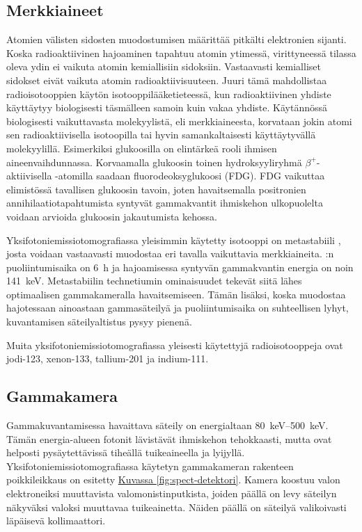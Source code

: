 \subsection{Merkkiaineet}
Atomien välisten sidosten muodostumisen määrittää pitkälti elektronien sijanti. Koska radioaktiivinen hajoaminen tapahtuu atomin ytimessä, virittyneessä tilassa oleva ydin ei vaikuta atomin kemiallisiin sidoksiin. Vastaavasti kemialliset sidokset eivät vaikuta atomin radioaktiivisuuteen.\cite{cherry_modes_2012} Juuri tämä mahdollistaa radioisotooppien käytön isotooppilääketieteessä, kun radioaktiivinen yhdiste käyttäytyy biologisesti täsmälleen samoin kuin vakaa yhdiste. Käytännössä biologisesti vaikuttavasta molekyylistä, eli merkkiaineesta, korvataan jokin atomi sen radioaktiivisella isotoopilla tai hyvin samankaltaisesti käyttäytyvällä molekyylillä\cite{cherry_modes_2012, crisan_radiopharmaceuticals_2022}. Esimerkiksi glukoosilla on elintärkeä rooli ihmisen aineenvaihdunnassa. Korvaamalla glukoosin toinen hydroksyyliryhmä $\beta^{+}$-aktiivisella -atomilla saadaan fluorodeoksyglukoosi (FDG). FDG vaikuttaa elimistössä tavallisen glukoosin tavoin, joten havaitsemalla positronien annihilaatiotapahtumista syntyvät gammakvantit ihmiskehon ulkopuolelta voidaan arvioida glukoosin jakautumista kehossa.\cite{crisan_radiopharmaceuticals_2022}

Yksifotoniemissiotomografiassa yleisimmin käytetty isotooppi on metastabiili , josta voidaan vastaavasti muodostaa eri tavalla vaikuttavia merkkiaineita. :n puoliintumisaika on \qty{6}{\hour} ja hajoamisessa syntyvän gammakvantin energia on noin \qty{141}{\kilo\electronvolt}.\cite{cherry_interaction_2012, cherry_single_2012, crisan_radiopharmaceuticals_2022, van_audenhaege_review_2015} Metastabiilin technetiumin ominaisuudet tekevät siitä lähes optimaalisen gammakameralla havaitsemiseen. Tämän lisäksi, koska  muodostaa hajotessaan ainoastaan gammasäteilyä ja puoliintumisaika on suhteellisen lyhyt, kuvantamisen säteilyaltistus pysyy pienenä.\cite{cherry_modes_2012, crisan_radiopharmaceuticals_2022}

Muita yksifotoniemissiotomografiassa yleisesti käytettyjä radioisotooppeja ovat jodi-123, xenon-133, tallium-201 ja indium-111\cite{crisan_radiopharmaceuticals_2022}.

\subsection{Gammakamera}
Gammakuvantamisessa havaittava säteily on energialtaan \qtyrange{80}{500}{\kilo\electronvolt}. Tämän energia-alueen fotonit lävistävät ihmiskehon tehokkaasti, mutta ovat helposti pysäytettävissä tiheällä tuikeaineella ja lyijyllä.\cite{cherry_gamma_2012} Yksifotoniemissiotomografiassa käytetyn gammakameran rakenteen poikkileikkaus on esitetty \hyperref[fig:spect-detektori]{Kuvassa \ref*{fig:spect-detektori}}. Kamera koostuu valon elektroneiksi muuttavista valomonistinputkista, joiden päällä on levy säteilyn näkyväksi valoksi muuttavaa tuikeainetta. Näiden päällä on säteilyä valikoivasti läpäisevä kollimaattori.\cite{van_audenhaege_review_2015, cherry_gamma_2012}

